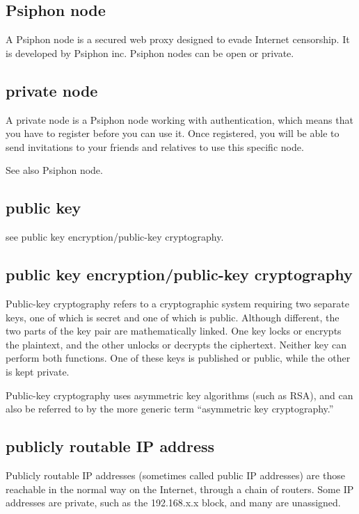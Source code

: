 \subsection{Psiphon node}

A Psiphon node is a secured web proxy designed to evade Internet
censorship. It is developed by Psiphon inc. Psiphon nodes can be open or
private.

\subsection{private node}

A private node is a Psiphon node working with authentication, which
means that you have to register before you can use it. Once registered,
you will be able to send invitations to your friends and relatives to
use this specific node.

See also Psiphon node.

\subsection{public key}

see public key encryption/public-key cryptography.

\subsection{public key encryption/public-key cryptography}

Public-key cryptography refers to a cryptographic system requiring two
separate keys, one of which is secret and one of which is public.
Although different, the two parts of the key pair are mathematically
linked. One key locks or encrypts the plaintext, and the other unlocks
or decrypts the ciphertext. Neither key can perform both functions. One
of these keys is published or public, while the other is kept private.

Public-key cryptography uses asymmetric key algorithms (such as RSA),
and can also be referred to by the more generic term ``asymmetric key
cryptography.''

\subsection{publicly routable IP address}

Publicly routable IP addresses (sometimes called public IP addresses)
are those reachable in the normal way on the Internet, through a chain
of routers. Some IP addresses are private, such as the 192.168.x.x
block, and many are unassigned.


